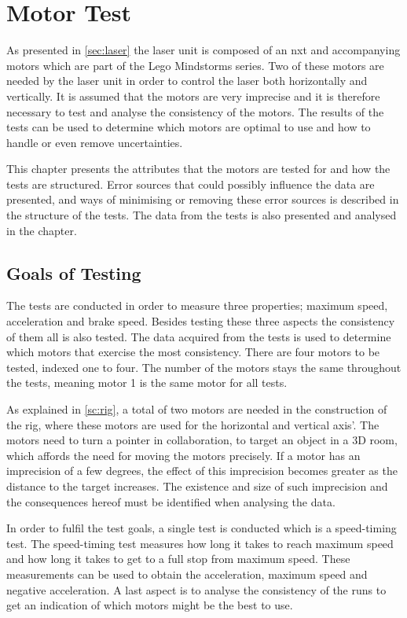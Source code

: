 \chapter{Motor Test} \label{chpt:motor_test}
As presented in \cref{sec:laser} the laser unit is composed of an \gls{nxt} and accompanying motors which are part of the Lego Mindstorms series. Two of these motors are needed by the laser unit in order to control the laser both horizontally and vertically. It is assumed that the motors are very imprecise and it is therefore necessary to test and analyse the consistency of the motors. The results of the tests can be used to determine which motors are optimal to use and how to handle or even remove uncertainties.

This chapter presents the attributes that the motors are tested for and how the tests are structured. Error sources that could possibly influence the data are presented, and ways of minimising or removing these error sources is described in the structure of the tests. The data from the tests is also presented and analysed in the chapter.

\section{Goals of Testing}\label{sec:test_goals}
The tests are conducted in order to measure three properties; maximum speed, acceleration and brake speed. Besides testing these three aspects the consistency of them all is also tested. The data acquired from the tests is used to determine which motors that exercise the most consistency. There are four motors to be tested, indexed one to four. The number of the motors stays the same throughout the tests, meaning motor 1 is the same motor for all tests.

As explained in \cref{sc:rig}, a total of two motors are needed in the construction of the rig, where these motors are used for the horizontal and vertical axis'. The motors need to turn a pointer in collaboration, to target an object in a 3D room, which affords the need for moving the motors precisely. If a motor has an imprecision of a few degrees, the effect of this imprecision becomes greater as the distance to the target increases. The existence and size of such imprecision and the consequences hereof must be identified when analysing the data.

In order to fulfil the test goals, a single test is conducted which is a speed-timing test. The speed-timing test measures how long it takes to reach maximum speed and how long it takes to get to a full stop from maximum speed. These measurements can be used to obtain the acceleration, maximum speed and negative acceleration. A last aspect is to analyse the consistency of the runs to get an indication of which motors might be the best to use.

